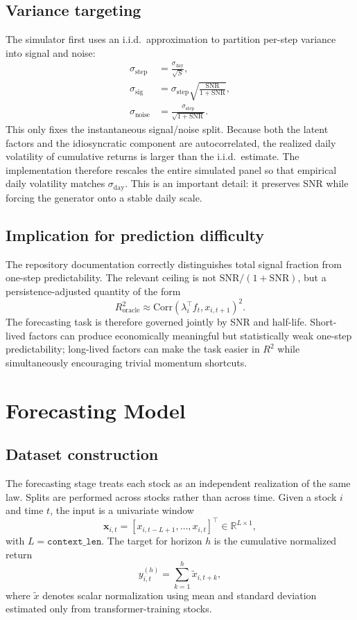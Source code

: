 \documentclass[11pt]{article}
\begin{document}
\subsection{Variance targeting}
The simulator first uses an i.i.d.\ approximation to partition per-step variance into signal and noise:
\begin{align}
\sigma_{\text{step}} &= \frac{\sigma_{\text{day}}}{\sqrt{S}}, \\
\sigma_{\text{sig}} &= \sigma_{\text{step}} \sqrt{\frac{\mathrm{SNR}}{1+\mathrm{SNR}}}, \\
\sigma_{\text{noise}} &= \frac{\sigma_{\text{step}}}{\sqrt{1+\mathrm{SNR}}}.
\end{align}
This only fixes the instantaneous signal/noise split. Because both the latent factors and the idiosyncratic component are autocorrelated, the realized daily volatility of cumulative returns is larger than the i.i.d.\ estimate. The implementation therefore rescales the entire simulated panel so that empirical daily volatility matches \(\sigma_{\text{day}}\). This is an important detail: it preserves SNR while forcing the generator onto a stable daily scale.

\subsection{Implication for prediction difficulty}
The repository documentation correctly distinguishes total signal fraction from one-step predictability. The relevant ceiling is not \(\mathrm{SNR}/(1+\mathrm{SNR})\), but a persistence-adjusted quantity of the form
\[
R^2_{\text{oracle}} \approx \mathrm{Corr}(\lambda_i^\top f_t, x_{i,t+1})^2.
\]
The forecasting task is therefore governed jointly by SNR and half-life. Short-lived factors can produce economically meaningful but statistically weak one-step predictability; long-lived factors can make the task easier in \(R^2\) while simultaneously encouraging trivial momentum shortcuts.

\section{Forecasting Model}
\subsection{Dataset construction}
The forecasting stage treats each stock as an independent realization of the same law. Splits are performed across stocks rather than across time. Given a stock \(i\) and time \(t\), the input is a univariate window
\[
\mathbf{x}_{i,t} = [x_{i,t-L+1}, \ldots, x_{i,t}]^\top \in \mathbb{R}^{L \times 1},
\]
with \(L=\texttt{context\_len}\). The target for horizon \(h\) is the cumulative normalized return
\[
y^{(h)}_{i,t} = \sum_{k=1}^{h} \tilde{x}_{i,t+k},
\]
where \(\tilde{x}\) denotes scalar normalization using mean and standard deviation estimated only from transformer-training stocks.
\end{document}

